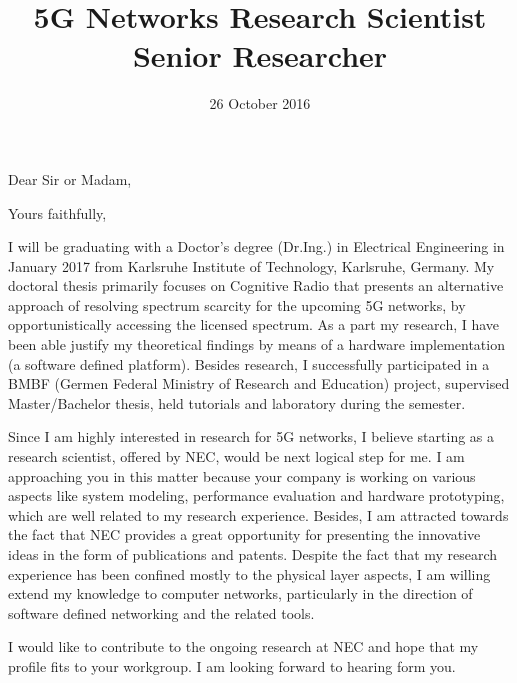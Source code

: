 \documentclass[11pt,a4paper,sans]{moderncv}        %
\title{5G Networks Research Scientist Senior Researcher}                               %
\begin{document}
\date{26 October 2016}
\opening{Dear Sir or Madam,}
\closing{Yours faithfully,}
\makelettertitle
I will be graduating with a Doctor's degree (Dr.Ing.) in Electrical Engineering in January 2017 from Karlsruhe Institute of Technology, Karlsruhe, Germany. My doctoral thesis primarily focuses on Cognitive Radio that presents an alternative approach of resolving spectrum scarcity for the upcoming 5G networks, by opportunistically accessing the licensed spectrum. As a part my research, I have been able justify my theoretical findings by means of a hardware implementation (a software defined platform). Besides research, I successfully participated in a BMBF (Germen Federal Ministry of Research and Education) project, supervised Master/Bachelor thesis, held tutorials and laboratory during the semester. 

Since I am highly interested in research for 5G networks, I believe starting as a research scientist, offered by NEC, would be next logical step for me. I am approaching you in this matter because your company is working on various aspects like system modeling, performance evaluation and hardware prototyping, which are well related to my research experience. Besides, I am attracted towards the fact that NEC provides a great opportunity for presenting the innovative ideas in the form of publications and patents. Despite the fact that my research experience has been confined mostly to the physical layer aspects, I am willing extend my knowledge to computer networks, particularly in the direction of software defined networking and the related tools.   

I would like to contribute to the ongoing research at NEC and hope that my profile fits to your workgroup. I am looking forward to hearing form you. 


\makeletterclosing
\end{document}
